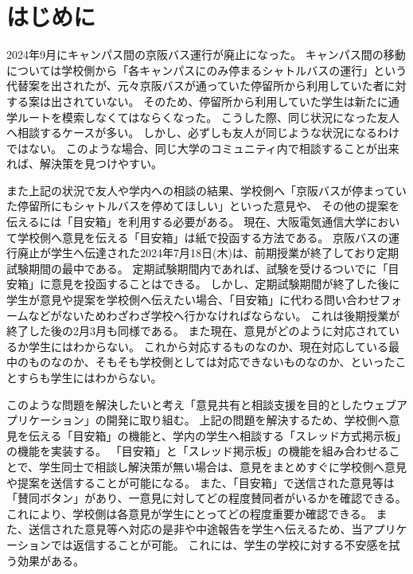 \documentclass[main]{subfiles}
\begin{document}
\chapter{はじめに}
\label{cha:intro}

2024年9月にキャンパス間の京阪バス運行が廃止になった。
キャンパス間の移動については学校側から「各キャンパスにのみ停まるシャトルバスの運行」という代替案を出されたが、元々京阪バスが通っていた停留所から利用していた者に対する案は出されていない。
そのため、停留所から利用していた学生は新たに通学ルートを模索しなくてはならくなった。
こうした際、同じ状況になった友人へ相談するケースが多い。
しかし、必ずしも友人が同じような状況になるわけではない。
このような場合、同じ大学のコミュニティ内で相談することが出来れば、解決策を見つけやすい。

また上記の状況で友人や学内への相談の結果、学校側へ「京阪バスが停まっていた停留所にもシャトルバスを停めてほしい」といった意見や、
その他の提案を伝えるには「目安箱」を利用する必要がある。
現在、大阪電気通信大学において学校側へ意見を伝える「目安箱」は紙で投函する方法である。
京阪バスの運行廃止が学生へ伝達された2024年7月18日(木)は、前期授業が終了しており定期試験期間の最中である。
定期試験期間内であれば、試験を受けるついでに「目安箱」に意見を投函することはできる。
しかし、定期試験期間が終了した後に学生が意見や提案を学校側へ伝えたい場合、「目安箱」に代わる問い合わせフォームなどがないためわざわざ学校へ行かなければならない。
これは後期授業が終了した後の2月3月も同様である。
また現在、意見がどのように対応されているか学生にはわからない。
これから対応するものなのか、現在対応している最中のものなのか、そもそも学校側としては対応できないものなのか、といったことすらも学生にはわからない。

このような問題を解決したいと考え「意見共有と相談支援を目的としたウェブアプリケーション」の開発に取り組む。
上記の問題を解決するため、学校側へ意見を伝える「目安箱」の機能と、学内の学生へ相談する「スレッド方式掲示板」の機能を実装する。
「目安箱」と「スレッド掲示板」の機能を組み合わせることで、学生同士で相談し解決策が無い場合は、意見をまとめすぐに学校側へ意見や提案を送信することが可能になる。
また、「目安箱」で送信された意見等は「賛同ボタン」があり、一意見に対してどの程度賛同者がいるかを確認できる。
これにより、学校側は各意見が学生にとってどの程度重要か確認できる。
また、送信された意見等へ対応の是非や中途報告を学生へ伝えるため、当アプリケーションでは返信することが可能。
これには、学生の学校に対する不安感を拭う効果がある。
\end{document}
